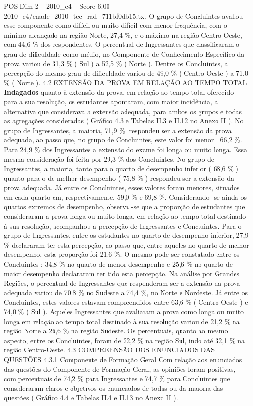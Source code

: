\begin{textsample}{POS Dim 2 – 2010\_c4 – Score 6.00 – 2010\_c4/enade\_2010\_tec\_rad\_711bf0db15.txt}
O grupo de Concluintes avaliou esse componente como difícil ou muito difícil com menor frequência, com o mínimo alcançado na região Norte, 27,4 \%, e o máximo na região Centro-Oeste, com 44,6 \% dos respondentes.
O percentual de Ingressantes que classificaram o grau de dificuldade como médio, no Componente de Conhecimento Específico da prova variou de 31,3 \% ( Sul ) a 52,5 \% ( Norte ).
Dentre os Concluintes, a percepção do mesmo grau de dificuldade variou de 49,0 \% ( Centro-Oeste ) a 71,0 \% ( Norte ). 4.2 EXTENSÃO DA PROVA EM RELAÇÃO AO TEMPO TOTAL \textbf{Indagados} quanto à extensão da prova, em relação ao tempo total oferecido para a sua resolução, os estudantes apontaram, com maior incidência, a alternativa que considerava a extensão adequada, para ambos os grupos e todas as agregações consideradas ( Gráfico 4.3 e Tabelas II.3 e II.12 no Anexo II ).
No grupo de Ingressantes, a maioria, 71,9 \%, respondeu ser a extensão da prova adequada, ao passo que, no grupo de Concluintes, este valor foi menor : 66,2 \%.
Para 24,9 \% dos Ingressantes a extensão do exame foi longa ou muito longa.
Essa mesma consideração foi feita por 29,3 \% dos Concluintes.
No grupo de Ingressantes, a maioria, tanto para o quarto de desempenho inferior ( 68,6 \% ) quanto para o de melhor desempenho ( 75,8 \% ) respondeu ser a extensão da prova adequada.
Já entre os Concluintes, esses valores foram menores, situados em cada quarto em, respectivamente, 59,0 \% e 69,8 \%.
Considerando -se ainda os quartos extremos de desempenho, observa -se que a proporção de estudantes que consideraram a prova longa ou muito longa, em relação ao tempo total destinado à sua resolução, acompanhou a percepção de Ingressantes e Concluintes.
Para o grupo de Ingressantes, entre os estudantes no quarto de desempenho inferior, 27,9 \% declararam ter esta percepção, ao passo que, entre aqueles no quarto de melhor desempenho, esta proporção foi 21,6 \%.
O mesmo pode ser constatado entre os Concluintes : 34,8 \% no quarto de menor desempenho e 25,6 \% no quarto de maior desempenho declararam ter tido esta percepção.
Na análise por Grandes Regiões, o percentual de Ingressantes que responderam ser a extensão da prova adequada variou de 70,8 \% no Sudeste a 74,4 \%, no Norte e Nordeste.
Já entre os Concluintes, estes valores estavam compreendidos entre 63,6 \% ( Centro-Oeste ) e 74,0 \% ( Sul ).
Aqueles Ingressantes que avaliaram a prova como longa ou muito longa em relação ao tempo total destinado à sua resolução variou de 21,2 \% na região Norte a 26,6 \% na região Sudeste.
Os percentuais, quanto ao mesmo aspecto, entre os Concluintes, foram de 22,2 \% na região Sul, indo até 32,1 \% na região Centro-Oeste. 4.3 COMPREENSÃO DOS ENUNCIADOS DAS QUESTÕES 4.3.1 Componente de Formação Geral Com relação aos enunciados das questões do Componente de Formação Geral, as opiniões foram positivas, com percentuais de 74,2 \% para Ingressantes e 74,7 \% para Concluintes que consideraram claros e objetivos os enunciados de todas ou da maioria das questões ( Gráfico 4.4 e Tabelas II.4 e II.13 no Anexo II ).

\end{textsample}
